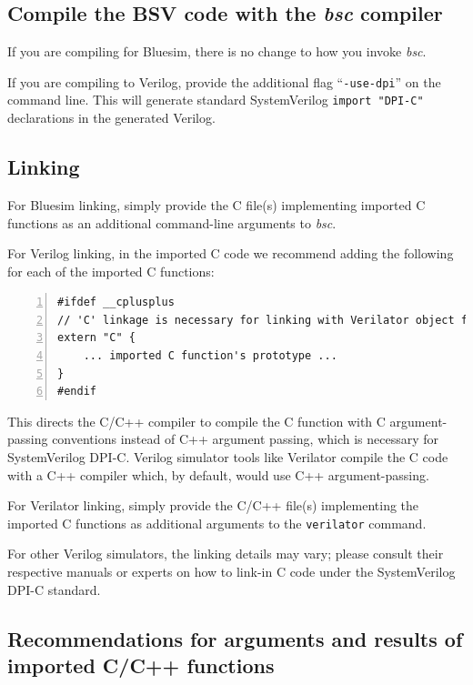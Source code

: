 \subsection{Compile the BSV code with the \emph{bsc} compiler}

If you are compiling for Bluesim, there is no change to how you invoke
\emph{bsc}.

If you are compiling to Verilog, provide the additional flag
``\verb|-use-dpi|'' on the command line.  This will generate standard
SystemVerilog \verb|import "DPI-C"| declarations in the generated
Verilog.


\subsection{Linking}

For Bluesim linking, simply provide the C file(s) implementing
imported C functions as an additional command-line arguments to
\emph{bsc}.

For Verilog linking, in the imported C code we recommend adding the
following for each of the imported C functions:

{\small
\begin{Verbatim}[frame=single, numbers=left]
#ifdef __cplusplus
// 'C' linkage is necessary for linking with Verilator object files
extern "C" {
    ... imported C function's prototype ...
}
#endif
\end{Verbatim}
}

This directs the C/C++ compiler to compile the C function with C
argument-passing conventions instead of C++ argument passing, which is
necessary for SystemVerilog DPI-C.  Verilog simulator tools like
Verilator compile the C code with a C++ compiler which, by default,
would use C++ argument-passing.

For Verilator linking, simply provide the C/C++ file(s) implementing
the imported C functions as additional arguments to the
\verb|verilator| command.

For other Verilog simulators, the linking details may vary; please
consult their respective manuals or experts on how to link-in C code
under the SystemVerilog DPI-C standard.


\subsection{Recommendations for arguments and results of imported C/C++ functions}


